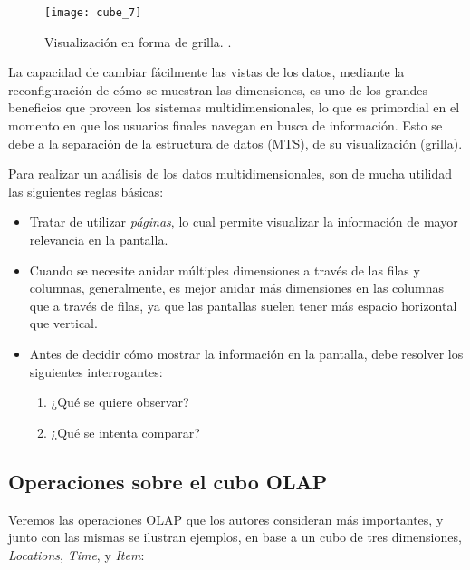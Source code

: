\documentclass[a4paper,11pt]{article}
\begin{document}
    \begin{figure}
      \begin{center}
        \texttt{[image: cube\_7]}
        \caption{Visualización en forma de grilla. \cite[p.~60]{olap_solutions}.}
        \label{cube_7}
      \end{center}
    \end{figure}
    
    
    La capacidad de cambiar fácilmente las vistas de los datos, mediante la reconfiguración de cómo se muestran las dimensiones, es uno de los grandes beneficios
    que proveen los sistemas multidimensionales, lo que es primordial en el momento en que los usuarios finales navegan en busca de información.
    Esto se debe a la separación de la estructura de datos (MTS), de su visualización (grilla).
    
    \vspace{0.2in}
    Para realizar un análisis de los datos multidimensionales, son de mucha utilidad las siguientes reglas básicas:
    
    \begin{itemize}
      \item Tratar de utilizar \textit{páginas}, lo cual permite visualizar la información de mayor relevancia en la pantalla.
      \item Cuando se necesite anidar múltiples dimensiones a través de las filas y columnas, generalmente, es mejor anidar más dimensiones en las columnas que
      a través de filas, ya que las pantallas suelen tener más espacio horizontal que vertical.
      \item Antes de decidir cómo mostrar la información en la pantalla, debe resolver los siguientes interrogantes:
        \begin{enumerate}
          \item ¿Qué se quiere observar?
          \item ¿Qué se intenta comparar?
        \end{enumerate}
    \end{itemize}
    
    
    \subsection{Operaciones sobre el cubo OLAP}
    
    Veremos las operaciones OLAP que los autores consideran más importantes, y junto con las mismas se ilustran
    ejemplos, en base a un cubo de tres dimensiones, \textit{Locations}, \textit{Time}, y \textit{Item}:
    
\end{document}
